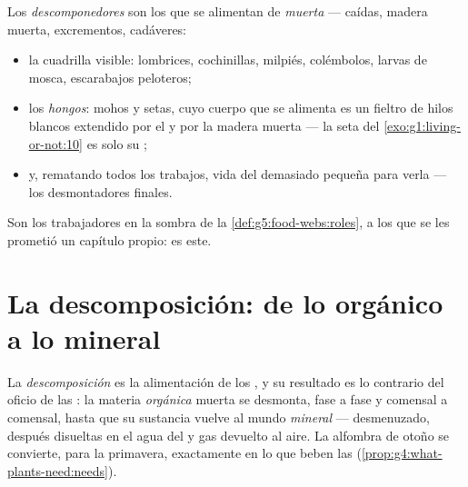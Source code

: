 \begin{definition}[Descomponedores]\label{def:g6:decomposers-and-soil:decomposers}
Los \emph{descomponedores} son los 
que se alimentan de \emph{ muerta} ---  caídas,
madera muerta, excrementos, cadáveres:
\begin{itemize}
  \item la cuadrilla visible: lombrices, cochinillas, milpiés,
        colémbolos, larvas de mosca, escarabajos peloteros;
  \item los \emph{hongos}: mohos y setas, cuyo cuerpo que
        se alimenta es un fieltro de hilos blancos extendido por el
         y por la madera muerta --- la seta del
        \cref{exo:g1:living-or-not:10} es solo su ;
  \item y, rematando todos los trabajos, vida del  demasiado
        pequeña para verla --- los desmontadores finales.
\end{itemize}
Son los trabajadores en la sombra de la
\cref{def:g5:food-webs:roles}, a los que se les prometió un capítulo
propio: es este.
\end{definition}

\section{La descomposición: de lo orgánico a lo mineral}

\begin{proposition}\label{prop:g6:decomposers-and-soil:decomposition}
La \emph{descomposición} es la alimentación de
los , y su resultado es lo contrario del oficio de las
: la materia \emph{orgánica} muerta se desmonta, fase a fase
y comensal a comensal, hasta que su sustancia vuelve al mundo
\emph{mineral} ---  desmenuzado, después  disueltas
en el agua del  y gas devuelto al aire. La alfombra de otoño se
convierte, para la primavera, exactamente en lo que beben las 
(\cref{prop:g4:what-plants-need:needs}).
\end{proposition}
\admitted

